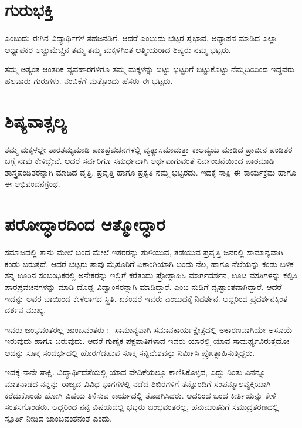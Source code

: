 \section*{ಗುರುಭಕ್ತಿ}  

   ಎಂಬುದು ಈಗಿನ ವಿದ್ಯಾರ್ಥಿಗಳ ಸಹಜನಡಿಗೆ.  ಆದರೆ   ಎಂಬುದು ಭಟ್ಟರ ಸ್ವಭಾವ.  ಅಧ್ಯಾಪನ ಮಾಡಿದ ಎಲ್ಲಾ ಅಧ್ಯಾಪಕರ ಅಚ್ಚುಮೆಚ್ಚಿನ ತಮ್ಮ ತಮ್ಮ ಮಕ್ಕಳಿಗಿಂತ ಆತ್ಮೀಯರಾದ ಶಿಷ್ಯರು ನಮ್ಮ ಭಟ್ಟರು.

ತಮ್ಮ ಅತ್ಯಂತ ಆಂತರಿಕ ವ್ಯವಹಾರಗಳಿಗೂ ತಮ್ಮ ಮಕ್ಕಳನ್ನು ಬಿಟ್ಟು ಭಟ್ಟರಿಗೆ ಬಿಟ್ಟುಕೊಟ್ಟು ನೆಮ್ಮದಿಯಿಂದ ಇದ್ದವರು ಹಲವಾರು ಗುರುಗಳು. ನಂಬಿಕೆಗೆ ಮತ್ತೊಂದು ಹೆಸರು ಈ ಭಟ್ಟರು.

\section*{ಶಿಷ್ಯವಾತ್ಸಲ್ಯ} 

ತಮ್ಮ ಮಕ್ಕಳಲ್ಲೇ ತಾರತಮ್ಯಮಾಡಿ ಪಾಠಪ್ರವಚನಗಳಲ್ಲಿ ವ್ಯತ್ಯಾಸಮಾಡುತ್ತಾ ಕಾಲವ್ಯಯ ಮಾಡಿದ ಪ್ರಾಚೀನ ಪಂಡಿತರ ಬಗ್ಗೆ ನಾವು ಕೇಳಿದ್ದೇವೆ.  ಆದರೆ ಸರ್ವರಿಗೂ ಸಮರ್ಥವಾಗಿ ಅರ್ಥವಾಗುವಂತೆ ನಿರ್ವಂಚನೆಯಿಂದ ಪಾಠಮಾಡಿ ಶಾಸ್ತ್ರಪಂಡಿತರನ್ನಾಗಿ ಮಾಡಿದ ವೃತ್ತಿ, ಪ್ರವೃತ್ತಿ ಹಾಗೂ ಪ್ರಕೃತಿ ನಮ್ಮ ಭಟ್ಟರದು.  ಇದಕ್ಕೆ ಸಾಕ್ಷಿ ಈ ಕಾರ್ಯಕ್ರಮ ಹಾಗೂ ಈ ಅಭಿವಂದನಗ್ರಂಥ.

\section*{ಪರೋದ್ಧಾರದಿಂದ ಆತ್ಮೋದ್ಧಾರ} 

ಸಮಾಜದಲ್ಲಿ ತಾನು ಮೇಲೆ ಬಂದ ಮೇಲೆ ಇತರರನ್ನು ತುಳಿಯುವ, ತಡೆಯುವ ಪ್ರವೃತ್ತಿ ಜನರಲ್ಲಿ ಸಾಮಾನ್ಯವಾಗಿ ಕಂಡು ಬರುತ್ತದೆ.  ಆದರೆ ಭಟ್ಟರು ತಾವು ಮೈಸೂರಿಗೆ ಏಕಾಂಗಿಯಾಗಿ ಬಂದು ನೆಲ, ಹಾಗೂ ನೆಲೆಯನ್ನು ಕಂಡು ಬಳಿಕ ತನ್ನ ಊರಿನ  ಸಂಬಂಧಿಕರಲ್ಲಿ ಅನೇಕರನ್ನು ಇಲ್ಲಿಗೆ ಕರೆತಂದು ಪ್ರೋತ್ಸಾಹಿಸಿ ಮಾರ್ಗದರ್ಶನ, ಊಟ ವಸತಿಗಳನ್ನು ಕಲ್ಪಿಸಿ ಪಾಠಪ್ರವಚನಗಳನ್ನು ಮಾಡಿ ದೊಡ್ಡ ವಿದ್ವಾಂಸರನ್ನಾಗಿ ಮಾಡಿದ್ದಾರೆ.  ಎಂಬ ನುಡಿಗೆ ದೃಷ್ಟಾಂತವಾಗಿದ್ದಾರೆ.  ಆದರೆ ಇದನ್ನು ಅವರ ಬಾಯಿಂದ ಕೇಳಲಾಗದ ಸ್ಥಿತಿ.  ಏಕೆಂದರೆ ಇವರು   ಎಂಬುದಕ್ಕೆ ನಿದರ್ಶನ. ಆದ್ದರಿಂದ ಪ್ರದರ್ಶನಕ್ಕಿಂತ ದರ್ಶನ ಮುಖ್ಯ. 

ಇವರು ಜಂಭವಂತರಲ್ಲ ಜಾಂಬವಂತರು :-  ಸಾಮಾನ್ಯವಾಗಿ ಸಮಾನಕಾರ್ಯಕ್ಷೇತ್ರದಲ್ಲಿ ಅಕಾರಣವಾಗಿಯೇ ಅಸೂಯೆ ಇರುವುದು ಹಾಗೂ ಬರುವುದು.  ಆದರೆ ಗುಣೈಕ ಪಕ್ಷಪಾತಿಗಳಾದ ಇವರು ಯಾರಲ್ಲಿ ಯಾವ ಸಾಮರ್ಥ್ಯವಿರುತ್ತದೋ ಅದನ್ನು ಸೂಕ್ತ ಸಂದರ್ಭದಲ್ಲಿ ಹೊರಗೆಡಹುವ  ಸೂಕ್ತ ಸನ್ನಿವೇಶವನ್ನು ನಿರ್ಮಿಸಿ ಪ್ರೋತ್ಸಾಹಿಸುತ್ತಿದ್ದರು. 

ಇದಕ್ಕೆ ನಾನೇ ಸಾಕ್ಷಿ.  ವಿದ್ಯಾರ್ಥಿದೆಸೆಯಲ್ಲಿ ಯಾವ ವೇದಿಕೆಯಲ್ಲೂ ಕಾಣಿಸಿಕೊಳ್ಳದ, ಎದ್ದು ನಿಂತು ಏನನ್ನೂ ಮಾತನಾಡದ ನನ್ನನ್ನು ರಾಜ್ಯದ ವಿವಿಧ ಭಾಗಗಳಲ್ಲಿ ನಡೆದ ಶಿಬಿರಗಳಿಗೆ ತನ್ನೊಂದಿಗೆ ಸಂಪನ್ಮೂಲವ್ಯಕ್ತಿಯಾಗಿ ಕರೆದುಕೊಂಡು ಹೋಗಿ ವಿಷಯ ತಿಳಿಸುವ ಕಾರ್ಯದಲ್ಲಿ ತೊಡಗಿಸಿದರು.  ಅದರಿಂದ ಬಂದ ಕೀರ್ತಿಯನ್ನು ಕೇಳಿ ಸಂತಸಗೊಂಡರು.  ಆದ್ದರಿಂದ ನನ್ನ ವಿಷಯದಲ್ಲಿ ಭಟ್ಟರು ಜಂಭವಂತರಲ್ಲ,  ಹನುಮಂತನಿಗೆ  ಸಮುದ್ರತರಣದಲ್ಲಿ  ಸ್ಪೂರ್ತಿ ನೀಡಿದ  ಜಾಂಬವಂತನಂತೆ ಎಂದು.

